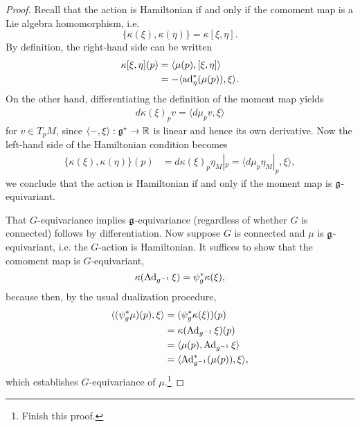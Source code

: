 \documentclass{amsart}
\begin{document}
\begin{proof}
    Recall that the action is Hamiltonian if and only if the comoment map is a Lie algebra
    homomorphism, i.e.
    \begin{equation*}
        \{\kappa(\xi), \kappa(\eta)\} = \kappa[\xi,\eta].
    \end{equation*}
    By definition, the right-hand side can be written
    \begin{align*}
        \kappa[\xi,\eta](p) &= \langle \mu(p), [\xi,\eta]\rangle\\
        &= -\langle \operatorname{ad}_\eta^*(\mu(p)), \xi\rangle.
    \end{align*}
    On the other hand, differentiating the definition of the moment map yields
    \begin{align*}
        d\kappa(\xi)_p v= \langle d\mu_p v, \xi\rangle
    \end{align*}
    for $v\in T_pM$, since $\langle-,\xi\rangle:\mathfrak g^*\to\mathbb{R}$ is linear and hence its own derivative.
    Now the left-hand side of the Hamiltonian condition becomes
    \begin{align*}
        \{\kappa(\xi),\kappa(\eta)\}(p) &= d\kappa(\xi)_p\eta_M|_p = \langle d\mu_p\eta_M|_p, \xi\rangle,
    \end{align*}
    we conclude that the action is Hamiltonian if and only if the moment map is $\mathfrak g$-equivariant.

    That $G$-equivariance implies $\mathfrak g$-equivariance (regardless of whether $G$ is connected) follows
    by differentiation. Now suppose $G$ is connected and $\mu$ is $\mathfrak g$-equivariant, i.e. the $G$-action
    is Hamiltonian. It suffices to show that the comoment map is $G$-equivariant,
    \begin{equation*}
        \kappa(\operatorname{Ad}_{g^{-1}}\xi) = \psi_g^*\kappa(\xi),
    \end{equation*}
    because then, by the usual dualization procedure,
    \begin{align*}
        \langle (\psi_g^*\mu)(p), \xi\rangle &= (\psi_g^*\kappa(\xi))(p)\\
        &= \kappa(\operatorname{Ad}_{g^{-1}}\xi)(p)\\
        &= \langle \mu(p), \operatorname{Ad}_{g^{-1}}\xi\rangle\\
        &= \langle \operatorname{Ad}_{g^{-1}}^*(\mu(p)), \xi\rangle,
    \end{align*}
    which establishes $G$-equivariance of $\mu$.\footnote{Finish this proof.}
\end{proof}
\end{document}
